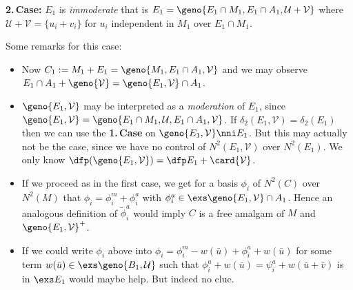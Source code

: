 \documentclass[a4paper,11pt,german,english]{article}
\begin{document}
\bigskip
{\bf 2.{}\,Case:}
$E_{1}$ is {\em immoderate} that is $E_{1}=\geno{E_{1}\cap M_{1},E_{1}\cap A_{1},\mathcal{U+V}}$
where $\mathcal{U+V}=\{u_{i}+v_{i}\}$ for $u_{i}$ independent in $M_{1}$ over $E_{1}\cap M_{1}$.

\smallskip
Some remarks for this case:
\begin{itemize}
\item Now $C_{1}:=M_{1}+E_{1}=\geno{M_{1},E_{1}\cap A_{1},\mathcal{V}}$
and we may observe\\
$E_{1}\cap A_{1}+\geno{\mathcal{V}}=\geno{E_{1},\mathcal{V}}\cap
A_{1}$.
\item $\geno{E_{1},\mathcal{V}}$ may be interpreted as a \emph{moderation} of $E_{1}$,
since $\geno{E_{1},\mathcal{V}}=\geno{E_{1}\cap M_{1},\mathcal{U},E_{1}\cap A_{1},\mathcal{V}}$. If $\delta_{2}(E_{1},\mathcal{V})=\delta_{2}(E_{1})$ then we can use the {\bf 1.{}\,Case}
on $\geno{E_{1},\mathcal{V}}\nni E_{1}$. But this may actually not be the case, since
we have no control of $N^{2}(E_{1},\mathcal{V})$ over $N^{2}(E_{1})$. We only
know $\dfp(\geno{E_{1},\mathcal{V}})=\dfp E_{1}+\card{\mathcal{V}}$.

\item If we proceed as in the first case, we get for a basis $\phi_{i}$ of $N^{2}(C)$ over
$N^{2}(M)$ that $\phi_{i}=\phi_{i}^{m}+\phi_{i}^{a}$ with $\phi_{i}^{a}\in\exs \geno{E_{1},\mathcal{V}}\cap A_{1}$. Hence an analogous definition of $\tilde\phi _{i}^{a}$ would
imply $C$ is a free amalgam of $M$ and $\geno{E_{1},\mathcal{V}}^{+}$.

\item If we could write $\phi_{i}$ above into $\phi_{i}=\phi_{i}^{m}-w(\bar u)+
\phi_{i}^{a}+w(\bar u)$ for some term $w(\bar u)\in\exs\geno{B_{1},\mathcal{U}}$ such that
$\phi_{i}^{a}+w(\bar u)=\psi_{i}^{a}+w(\bar u + \bar v)$ is in $\exs E_{1}$ would maybe help. But indeed no clue.
\end{itemize}
\end{document}

